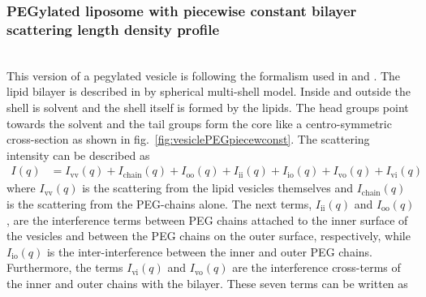 \subsubsection{PEGylated liposome with piecewise constant bilayer scattering length density profile} ~\\

This version of a pegylated vesicle is following the formalism used in \cite{Arleth2010} and \cite{Nielsen2018}. The lipid bilayer is described in by spherical multi-shell model. Inside and outside the shell is solvent and the shell itself is formed by the lipids. The head groups point towards the solvent and the tail groups form the core like a centro-symmetric cross-section as shown in fig.\ \ref{fig:vesiclePEGpiecewconst}. The scattering intensity can be described as
\begin{align}\label{eq:vesicePEGsphsh}
  I(q) &= I_\mathrm{vv}(q) + I_\mathrm{chain}(q) + I_\mathrm{oo}(q) + I_\mathrm{ii}(q) + I_\mathrm{io}(q) +  I_\mathrm{vo}(q) + I_\mathrm{vi}(q)
\end{align}
where $I_\mathrm{vv}(q)$ is the scattering from the lipid vesicles themselves and $I_\mathrm{chain}(q)$ is the scattering from the PEG-chains alone. The next terms, $I_\mathrm{ii}(q)$ and $I_\mathrm{oo}(q)$, are the interference terms
between PEG chains attached to the inner surface of the
vesicles and between the PEG chains on the outer surface,
respectively, while $ I_\mathrm{io}(q)$ is the inter-interference between the
inner and outer PEG chains. Furthermore, the terms $I_\mathrm{vi}(q)$ and $I_\mathrm{vo}(q)$ are the interference
cross-terms of the inner and outer chains with the bilayer.
These seven terms can be written as
